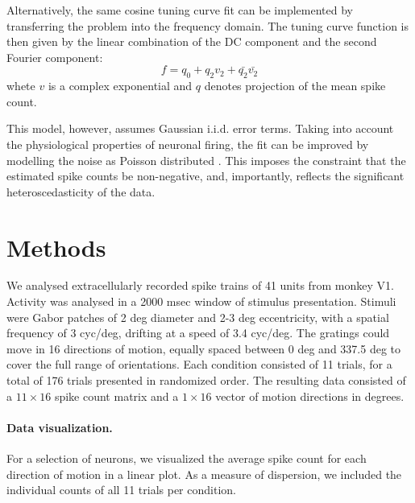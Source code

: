\documentclass[10pt]{article}
\begin{document}
Alternatively, the same cosine tuning curve fit can be implemented by transferring the problem into the frequency domain. The tuning curve function is then given by the linear combination of the DC component and the second Fourier component:
\begin{equation*}
f = q_0+q_2v_2+ \bar{q_2}\bar{v_2}
\end{equation*}
whete $v$ is a complex exponential and $q$ denotes projection of the mean spike count.

This model, however, assumes Gaussian i.i.d. error terms. Taking into account the physiological properties of neuronal firing, the fit can be improved by modelling the noise as Poisson distributed \cite{softky1993highly}. This imposes the constraint that the estimated spike counts be non-negative, and, importantly, reflects the significant heteroscedasticity of the data.


\section*{Methods}

We analysed extracellularly recorded spike trains of 41 units from monkey V1. Activity was analysed in a 2000 msec window of stimulus presentation. Stimuli were Gabor patches of 2 deg diameter and 2-3 deg eccentricity, with a spatial frequency of 3 cyc/deg, drifting at a speed of 3.4 cyc/deg. The gratings could move in 16 directions of motion, equally spaced between 0 deg and 337.5 deg to cover the full range of orientations. Each condition consisted of 11 trials, for a total of 176 trials presented in randomized order. The resulting data consisted of a $11\times16$ spike count matrix and a $1\times16$ vector of motion directions in degrees.

\paragraph{Data visualization.} For a selection of neurons, we visualized the average spike count for each direction of motion in a linear plot. As a measure of dispersion, we included the individual counts of all 11 trials per condition.
\end{document}
